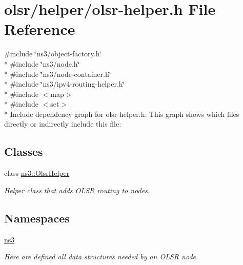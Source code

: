 \hypertarget{olsr-helper_8h}{}\section{olsr/helper/olsr-\/helper.h File Reference}
\label{olsr-helper_8h}
{\ttfamily \#include \char`\"{}ns3/object-\/factory.\+h\char`\"{}}\\*
{\ttfamily \#include \char`\"{}ns3/node.\+h\char`\"{}}\\*
{\ttfamily \#include \char`\"{}ns3/node-\/container.\+h\char`\"{}}\\*
{\ttfamily \#include \char`\"{}ns3/ipv4-\/routing-\/helper.\+h\char`\"{}}\\*
{\ttfamily \#include $<$map$>$}\\*
{\ttfamily \#include $<$set$>$}\\*
Include dependency graph for olsr-\/helper.h\+:
This graph shows which files directly or indirectly include this file\+:
\subsection*{Classes}
\begin{DoxyCompactItemize}
\item 
class \hyperlink{classns3_1_1OlsrHelper}{ns3\+::\+Olsr\+Helper}
\begin{DoxyCompactList}\small\item\em Helper class that adds O\+L\+SR routing to nodes. \end{DoxyCompactList}\end{DoxyCompactItemize}
\subsection*{Namespaces}
\begin{DoxyCompactItemize}
\item 
 \hyperlink{namespacens3}{ns3}
\begin{DoxyCompactList}\small\item\em Here are defined all data structures needed by an O\+L\+SR node. \end{DoxyCompactList}\end{DoxyCompactItemize}
